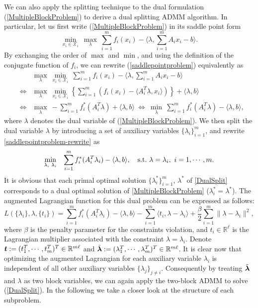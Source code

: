 \documentclass{mcom-l}
\theoremstyle{definition}
\theoremstyle{remark}
\numberwithin{equation}{section}
\begin{document}
{We can also apply the splitting technique to the dual formulation (\ref{MultipleBlockProblem}) to derive a dual splitting ADMM algorithm. In particular, let us first write (\ref{MultipleBlockProblem}) in its saddle point form
\begin{equation}\label{saddlepointproblem}
\min_{x_i\in {\mathcal{X}}_i} \ \max_{\lambda}\  \sum_{i=1}^m f_i(x_i) - \langle \lambda, \sum_{i=1}^m A_i x_i - b \rangle.
\end{equation}
By exchanging the order of $\max$ and $\min$, and using the definition of the conjugate function of $f_i$, we can rewrite (\ref{saddlepointproblem}) equivalently as
\begin{eqnarray}\label{saddlepointproblem-rewrite}
&&\max_{\lambda}\ \min_{x_i\in {\mathcal{X}}_i}\  \sum_{i=1}^m f_i(x_i) - \langle \lambda, \sum_{i=1}^m A_i x_i - b \rangle\nonumber\\
&\Leftrightarrow&  \max_{\lambda}\ \min_{x_i\in {\mathcal{X}}_i} \left\{ \sum_{i=1}^m \left( f_i(x_i) - \langle A_i^T \lambda, x_i \rangle\right)\right\} + \langle \lambda, b \rangle\nonumber\\
&\Leftrightarrow& \max_{\lambda}\  - \sum_{i=1}^m f_i^* (A_i^T \lambda) + \langle \lambda, b \rangle\  \Leftrightarrow\ \min_{\lambda}\  \sum_{i=1}^m f_i^* (A_i^T
\lambda) - \langle \lambda, b \rangle,
\end{eqnarray}
where $\lambda$ denotes the dual variable of (\ref{MultipleBlockProblem}). We then split the dual variable $\lambda$ by introducing a set of auxiliary variables $\{\lambda_i\}_{i=1}^{m}$, and rewrite \eqref{saddlepointproblem-rewrite} as
\begin{eqnarray}\label{DualSplit}
\min_{\lambda,\ \lambda_i}&&\sum_{i=1}^m f_i^* (A_i^T \lambda_i) - \langle \lambda, b \rangle,\quad \hbox{s.t.}\  \lambda = \lambda_i,\ i = 1,\cdots,m.
\end{eqnarray}
It is obvious that each primal optimal solution $\{\lambda_i^*\}_{i=1}^m$, $\lambda^*$ of \eqref{DualSplit} corresponds to a dual optimal solution of \eqref{MultipleBlockProblem} ($\lambda_i^* = \lambda^*$). The augmented Lagrangian function for this dual problem can be expressed as follows:
\begin{equation}\label{DualLag}
L(\{\lambda_i\},\lambda,\{t_i\}) = \sum_{i=1}^m f_i^* (A_i^T \lambda_i) - \langle\lambda, b\rangle - \sum_{i=1}^m \langle t_i, \lambda - \lambda_i \rangle + \frac{\beta}{2}\sum_{i=1}^m\| \lambda - \lambda_i \|^2,
\end{equation}
where $\beta$ is the penalty parameter for the constraints violation, and $t_i\in \mathbb{R}^{\ell}$ is the Lagrangian multiplier associated with the constraint $\lambda = \lambda_i$. Denote $\mbox{\boldmath$t$}: = (t_1^T,\cdots,t_m^T )^T\in \mathbb{R}^{m\ell}$ and $\tilde{\mbox{\boldmath$\lambda$}}: = (\lambda_1^T,\cdots,\lambda_m^T )^T\in \mathbb{R}^{m\ell}$. It is clear now that optimizing the augmented Lagrangian for each auxiliary variable $\lambda_i$ is independent of all other auxiliary variables $\{\lambda_j\}_{j\ne i}$. Consequently by treating $\tilde{\mbox{\boldmath$\lambda$}}$ and $\lambda$ as two block variables, we can again apply the two-block ADMM to solve (\ref{DualSplit}). In the following we take a closer look at the structure of each subproblem.

}
\end{document}
